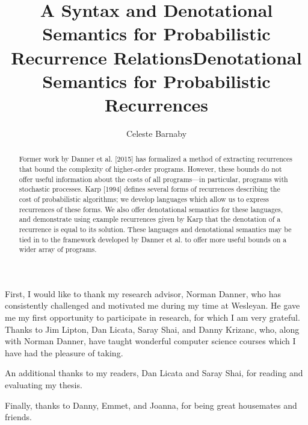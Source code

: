 \documentclass[12pt]{westhesis}
\title{A Syntax and Denotational Semantics for Probabilistic Recurrence Relations}
\theoremstyle{plain}
\theoremstyle{definition}
\begin{document}
\begin{abstract}
Former work by Danner et al. [2015] has formalized a method of extracting recurrences that bound the complexity
of higher-order programs. However, these bounds do not offer useful information about the costs of all programs---in particular,
programs with stochastic processes. Karp [1994] defines several forms of recurrences describing the cost of probabilistic
algorithms; we develop languages which allow us to express recurrences of these forms. We also offer denotational semantics for these languages, and demonstrate using example recurrences given by Karp that the denotation of a recurrence is equal to its solution. These languages and denotational semantics may be tied in to the framework developed by Danner et al. to offer
more useful bounds on a wider array of programs.
\end{abstract}

\begin{acknowledgements}

First, I would like to thank my research advisor, Norman Danner, who has consistently challenged and motivated me during my time at Wesleyan. He gave me my first opportunity to participate in research, for which I am very grateful. 
Thanks to Jim Lipton, Dan Licata, Saray Shai, and Danny Krizanc, who, along with Norman Danner, have
taught wonderful computer science courses which I have had the pleasure of taking. 

An additional thanks to my readers, Dan Licata and Saray Shai, for reading and evaluating my thesis. 

Finally, thanks to Danny, Emmet, and Joanna, for being great housemates and friends. 

\end{acknowledgements}

\title{Denotational Semantics for Probabilistic Recurrences}
\author{Celeste Barnaby}

\maketitle
\makeack
\makeabstract
\tableofcontents









\end{document}
